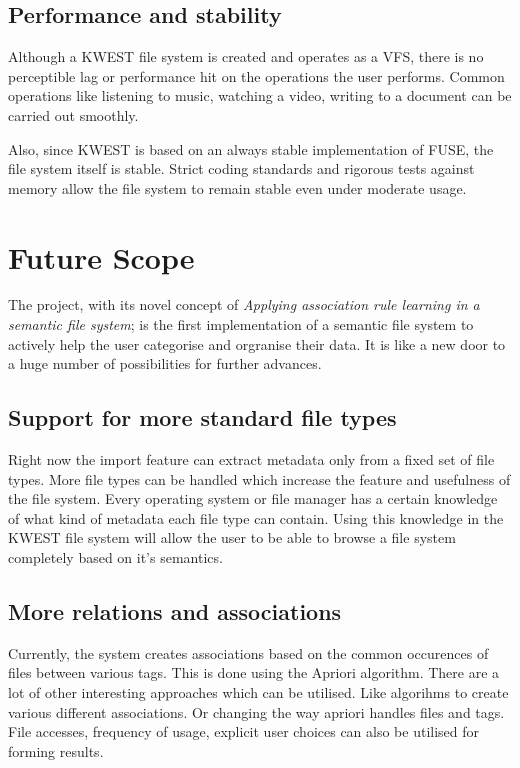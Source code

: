 \subsection*{Performance and stability}
Although a KWEST file system is created and operates as a VFS, there is no perceptible lag or performance hit on the operations the user performs. Common operations like listening to music, watching a video, writing to a document can be carried out smoothly.

Also, since KWEST is based on an always stable implementation of FUSE, the file system itself is stable. Strict coding standards and rigorous tests against memory allow the file system to remain stable even under moderate usage.


\section{Future Scope}

The project, with its novel concept of \textit{Applying association rule learning in a semantic file system}; is the first implementation of a semantic file system to actively help the user categorise and orgranise their data. It is like a new door to a huge number of possibilities for further advances.

\subsection*{Support for more standard file types}
Right now the import feature can extract metadata only from a fixed set of file types. More file types can be handled which increase the feature and usefulness of the file system. Every operating system or file manager has a certain knowledge of what kind of metadata each file type can contain. Using this knowledge in the KWEST file system will allow the user to be able to browse a file system completely based on it's semantics.

\subsection*{More relations and associations}
Currently, the system creates associations based on the common occurences of files between various tags. This is done using the Apriori algorithm. There are a lot of other interesting approaches which can be utilised. Like algorihms to create various different associations. Or changing the way apriori handles files and tags. File accesses, frequency of usage, explicit user choices can also be utilised for forming results.

